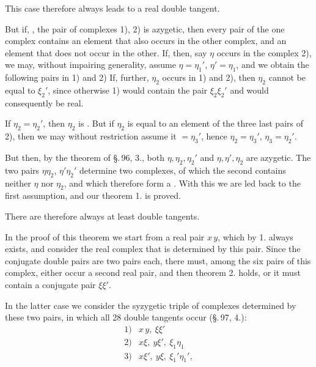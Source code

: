 This case therefore always leads to a real double tangent.

But if, , the pair of complexes 1), 2) is azygetic, then
every pair of the one complex contains an element that also occurs in the
other complex, and an element that does not occur in the other. If, then,
say $\eta$ occurs in the complex 2), we may, without impairing generality,
assume $\eta = \eta_1'$, $\eta' = \eta_1$,
and we obtain the following pairs in 1) and 2)
If, further, $\eta_2$ occurs in 1) and 2), then $\eta_2$ cannot be equal to
$\xi_2'$, since otherwise 1) would contain the pair $\xi_2\xi_2'$ and would
consequently be real.

If $\eta_2 = \eta_2'$, then $\eta_2$ is . But if $\eta_2$ is equal
to an element of the three last pairs of 2), then we may without
restriction assume it $= \eta_3'$, hence $\eta_2 = \eta_3'$, $\eta_3 = \eta_2'$.

But then, by the theorem of \S.\,96, 3., both $\eta, \eta_2, \eta_2'$ and
$\eta, \eta', \eta_2$ are azygetic. The two pairs $\eta\eta_2$, $\eta'\eta_2'$
determine two complexes, of which the second contains neither $\eta$ nor $\eta_2$,
and which therefore form a . With this we are led back
to the first assumption, and our theorem 1. is proved.

There are therefore always at least  double tangents.


In the proof of this theorem we start from a real pair $x\,y$, which
by 1. always exists, and consider the real complex that is determined
by this pair. Since the conjugate double pairs are two pairs each,
there must, among the six pairs of this complex,
either occur a second real pair, and then theorem
2. holds, or it must contain a conjugate pair $\xi\xi'$.

In the latter case we consider the syzygetic triple of complexes
determined by these two pairs, in which all 28 double tangents
occur (\S.\,97, 4.):
\[
\begin{array}{rl}
1) & x\,y,\ \xi\xi' \\
2) & x\xi,\ y\xi',\ \xi_1\eta_1 \\
3) & x\xi',\ y\xi,\ \xi_1'\eta_1',
\end{array}
\]
